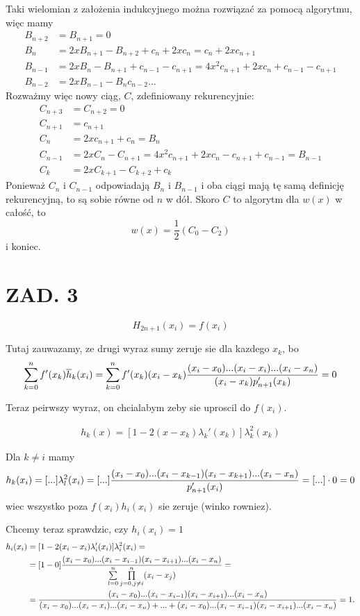 \documentclass{article}[16pt]
\begin{document}
Taki wielomian z założenia indukcyjnego można rozwiązać za pomocą algorytmu, więc mamy
\begin{align*}
    B_{n+2}&=B_{n+1}=0\\
    B_n&=2xB_{n+1}-B_{n+2}+c_n+2xc_n=c_n+2xc_{n+1}\\
    B_{n-1}&=2xB_n-B_{n+1}+c_{n-1}-c_{n+1}=4x^2c_{n+1}+2xc_n+c_{n-1}-c_{n+1}\\
    B_{n-2}&=2xB_{n-1}-B_nc_{n-2}...
\end{align*}
Rozważmy więc nowy ciąg, $C$, zdefiniowany rekurencyjnie:
\begin{align*}
    C_{n+3}&=C_{n+2}=0\\
    C_{n+1}&=c_{n+1}\\
    C_n&=2xc_{n+1}+c_n=B_n\\
    C_{n-1}&=2xC_n-C_{n+1}=4x^2c_{n+1}+2xc_n-c_{n+1}+c_{n-1}=B_{n-1}\\
    C_k&=2xC_{k+1}-C_{k+2}+c_k
\end{align*}
Ponieważ $C_n$ i $C_{n-1}$ odpowiadają $B_n$ i $B_{n-1}$ i oba ciągi mają tę samą definicję rekurencyjną, to są sobie równe od $n$ w dół. Skoro $C$ to algorytm dla $w(x)$ w całość, to
$$w(x)=\frac12(C_0-C_2)$$
i koniec.

\section*{ZAD. 3}

$$H_{2n+1}(x_i)=f(x_i)$$

Tutaj zauwazamy, ze drugi wyraz sumy zeruje sie dla kazdego $x_k$, bo
$$\sum\limits_{k=0}^nf'(x_k)\overline{h}_k(x_i)=\sum\limits_{k=0}^nf'(x_k)(x_i-x_k){(x_i-x_0)...(x_i-x_i)...(x_i-x_n)\over(x_i-x_k)p_{n+1}'(x_k)}=0$$

Teraz peirwszy wyraz, on chcialabym zeby sie uproscil do $f(x_i)$.

\begin{align*}
    h_k(x)=[1-2(x-x_k)\lambda_k'(x_k)]\lambda_k^2(x_k)
\end{align*}

Dla $k\neq i$ mamy
$$h_k(x_i)=[...]\lambda_l^2(x_i)=[...]{(x_i-x_0)...(x_i-x_{k-1})(x_i-x_{k+1})...(x_i-x_n)\over p_{n+1}'(x_i)}=[...]\cdot0=0$$
wiec wszystko poza $f(x_i)h_i(x_i)$ sie zeruje (winko rowniez).
\medskip

Chcemy teraz sprawdzic, czy $h_i(x_i)=1$
\begin{align*}
    h_i(x_i)&=[1-2(x_i-x_i)\lambda_i'(x_i)]\lambda_i^2(x_i)=\\
    &=[1-0]{(x_i-x_0)...(x_i-x_{i-1})(x_i-x_{i+1})...(x_i-x_n)\over \sum\limits_{l=0}^n\prod\limits_{j=0,j\neq i}^n(x_i-x_j)}=\\
    &={(x_i-x_0)...(x_i-x_{i-1})(x_i-x_{i+1})...(x_i-x_n)\over (x_i-x_0)...(x_i-x_i)...(x_i-x_n)+...+(x_i-x_0)...(x_i-x_{i-1})(x_i-x_{i+1})...(x_i-x_n)}=1.
\end{align*}
\end{document}
